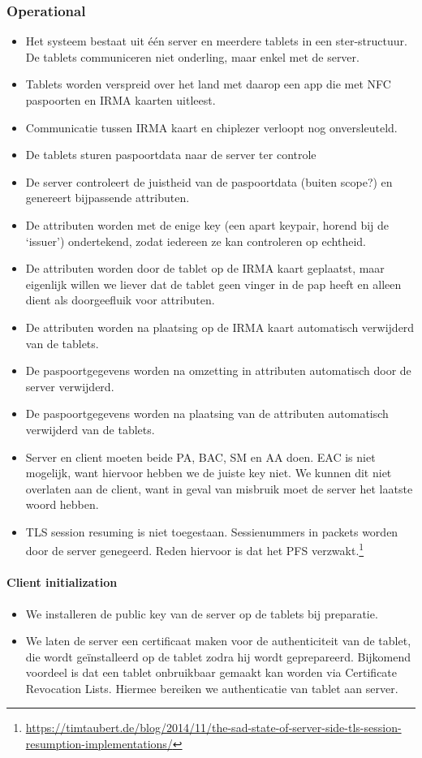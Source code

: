 \subsubsection{Operational}
\begin{itemize}
  \item Het systeem bestaat uit één server en meerdere tablets in een ster-structuur. De tablets communiceren niet onderling, maar enkel met de server.
  \item Tablets worden verspreid over het land met daarop een app die met NFC paspoorten en IRMA kaarten uitleest.
  \item Communicatie tussen IRMA kaart en chiplezer verloopt nog onversleuteld.
  \item De tablets sturen paspoortdata naar de server ter controle
  \item De server controleert de juistheid van de paspoortdata (buiten scope?) en genereert bijpassende attributen. 
  \item De attributen worden met de enige key (een apart keypair, horend bij de `issuer') ondertekend, zodat iedereen ze kan controleren op echtheid.
  \item De attributen worden door de tablet op de IRMA kaart geplaatst, maar eigenlijk willen we liever dat de tablet geen vinger in de pap heeft en alleen dient als doorgeefluik voor attributen.
  \item De attributen worden na plaatsing op de IRMA kaart automatisch verwijderd van de tablets.
  \item De paspoortgegevens worden na omzetting in attributen automatisch door de server verwijderd.
  \item De paspoortgegevens worden na plaatsing van de attributen automatisch verwijderd van de tablets.
  \item Server en client moeten beide PA, BAC, SM en AA doen. EAC is niet mogelijk, want hiervoor hebben we de juiste key niet. We kunnen dit niet overlaten aan de client, want in geval van misbruik moet de server het laatste woord hebben.
  \item TLS session resuming is niet toegestaan. Sessienummers in packets worden door de server genegeerd. Reden hiervoor is dat het PFS verzwakt.\footnote{\url{https://timtaubert.de/blog/2014/11/the-sad-state-of-server-side-tls-session-resumption-implementations/}}
\end{itemize}

\paragraph{Client initialization}
\begin{itemize}
	\item We installeren de public key van de server op de tablets bij preparatie.
  \item We laten de server een certificaat maken voor de authenticiteit van de tablet, die wordt geïnstalleerd op de tablet zodra hij wordt geprepareerd. Bijkomend voordeel is dat een tablet onbruikbaar gemaakt kan worden via Certificate Revocation Lists. Hiermee bereiken we authenticatie van tablet aan server.
\end{itemize}

